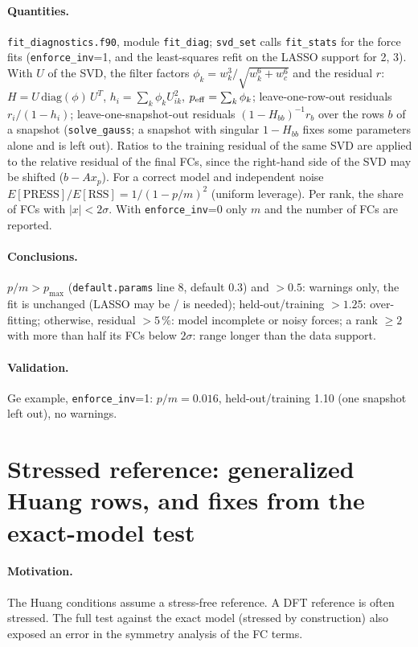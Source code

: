 \documentclass[11pt,a4paper]{article}
\newcommand{\code}[1]{\texttt{#1}}
\begin{document}
\paragraph{Quantities.} \code{fit\_diagnostics.f90}, module \code{fit\_diag}; \code{svd\_set} calls \code{fit\_stats} for
the force fits (\code{enforce\_inv}=1, and the least-squares refit on the LASSO support for 2, 3). With $U$ of the SVD,
the filter factors $\phi_k=w_k^3/\sqrt{w_k^6+w_c^6}$ and the residual $r$: $H=U\,\mathrm{diag}(\phi)\,U^T$,
$h_i=\sum_k\phi_kU_{ik}^2$, $p_{\rm eff}=\sum_k\phi_k$; leave-one-row-out residuals $r_i/(1-h_i)$; leave-one-snapshot-out
residuals $(1-H_{bb})^{-1}r_b$ over the rows $b$ of a snapshot (\code{solve\_gauss}; a snapshot with singular
$1-H_{bb}$ fixes some parameters alone and is left out). Ratios to the training residual of the same SVD are applied to
the relative residual of the final FCs, since the right-hand side of the SVD may be shifted ($b-Ax_p$). For a correct
model and independent noise $E[\mathrm{PRESS}]/E[\mathrm{RSS}]=1/(1-p/m)^2$ (uniform leverage). Per rank, the share of
FCs with $|x|<2\sigma$. With \code{enforce\_inv}=0 only $m$ and the number of FCs are reported.
\paragraph{Conclusions.} $p/m>p_{\max}$ (\code{default.params} line 8, default 0.3) and $>0.5$: warnings only, the fit is unchanged (LASSO may be / is needed); held-out/training $>1.25$:
over-fitting; otherwise, residual $>5\,\%$: model incomplete or noisy forces; a rank $\ge2$ with more than half its FCs
below $2\sigma$: range longer than the data support.
\paragraph{Validation.} Ge example, \code{enforce\_inv}=1: $p/m=0.016$, held-out/training 1.10 (one snapshot left
out), no warnings.

\section{Stressed reference: generalized Huang rows, and fixes from the exact-model test}\label{sec:huang}
\paragraph{Motivation.} The Huang conditions assume a stress-free reference. A DFT reference is often
stressed. The full test against the exact model (stressed by construction) also exposed an error in the
symmetry analysis of the FC terms.
\end{document}
